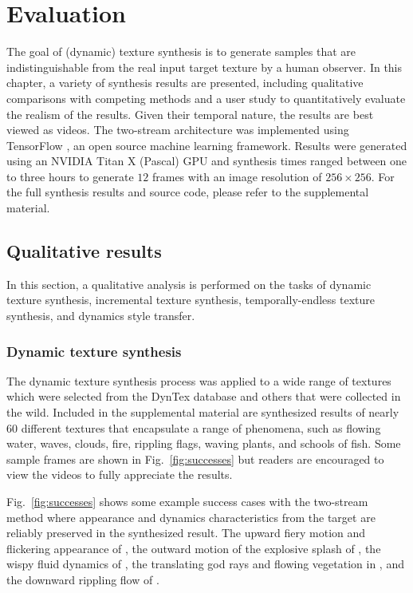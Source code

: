\chapter{Evaluation}\label{chap:evaluation}

The goal of (dynamic) texture synthesis is to generate 
samples that are indistinguishable from the real input target
texture by a human observer.
In this chapter, a variety of synthesis results are presented,
including qualitative comparisons with competing methods and a user study to quantitatively evaluate the realism
of the results.
Given their temporal nature, the results are best viewed as 
videos.
The two-stream architecture was implemented using TensorFlow
\cite{tabadi2015tensorflow}, an open source machine learning framework.
Results were generated using an NVIDIA Titan X (Pascal) GPU
and synthesis times ranged between one to three hours 
to generate $12$ frames with an image resolution of 
$256 \times 256$.
For the full synthesis results and source code, please refer to the
supplemental material. 

\section{Qualitative results}\label{sec:qualitative_results}

In this section, a qualitative analysis is performed on the tasks of dynamic texture synthesis, incremental texture synthesis,
temporally-endless texture synthesis, and dynamics style transfer.

\subsection{Dynamic texture synthesis}

The dynamic texture synthesis process was applied 
to a wide range of textures which were selected from the 
DynTex \cite{peteri2010} database and others that were collected in
the wild.
Included in the supplemental material are synthesized results
of nearly 60 different textures that encapsulate a range of
phenomena, such as flowing water, waves, clouds, fire, rippling
flags, waving plants, and schools of fish.
Some sample frames are shown in Fig.\ \ref{fig:successes}
but readers are encouraged to view the videos to fully appreciate
the results.

Fig.\ \ref{fig:successes} shows some example success cases with the
two-stream method where appearance and dynamics characteristics from the
target are reliably preserved in the synthesized result. The
upward fiery motion and flickering appearance of , the outward
motion of the explosive splash of ,
the wispy fluid dynamics of , the translating god rays and
flowing vegetation in , and the downward 
rippling flow of .

